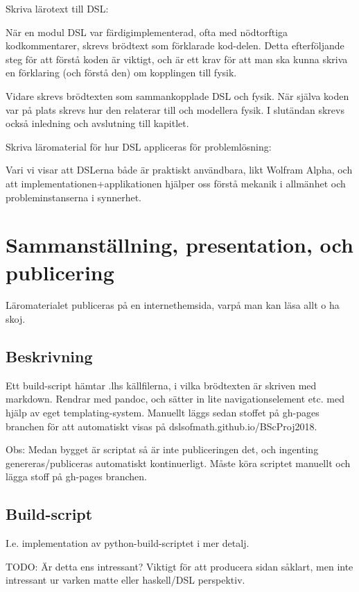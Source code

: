\begin{binge}
  Skriva lärotext till DSL:

  När en modul DSL var färdigimplementerad, ofta med nödtorftiga
  kodkommentarer, skrevs brödtext som förklarade kod-delen. Detta
  efterföljande steg för att förstå koden är viktigt, och är ett krav
  för att man ska kunna skriva en förklaring (och förstå den) om
  kopplingen till fysik.

  Vidare skrevs brödtexten som sammankopplade DSL och fysik. När
  själva koden var på plats skrevs hur den relaterar till och
  modellera fysik. I slutändan skrevs också inledning och avslutning
  till kapitlet.

  Skriva läromaterial för hur DSL appliceras för problemlösning:

  Vari vi visar att DSLerna både är praktiskt användbara, likt Wolfram
  Alpha, och att implementationen+applikationen hjälper oss förstå
  mekanik i allmänhet och probleminstanserna i synnerhet.



  \section{Sammanställning, presentation, och publicering}

  Läromaterialet publiceras på en internethemsida, varpå man kan läsa
  allt o ha skoj.

  \subsection{Beskrivning}

  Ett build-script hämtar .lhs källfilerna, i vilka brödtexten är
  skriven med markdown. Rendrar med pandoc, och sätter in lite
  navigationselement etc. med hjälp av eget templating-system. Manuellt
  läggs sedan stoffet på gh-pages branchen för att automatiskt visas på
  dslsofmath.github.io/BScProj2018.

  Obs: Medan bygget är scriptat så är inte publiceringen det, och
  ingenting genereras/publiceras automatiskt kontinuerligt. Måste köra
  scriptet manuellt och lägga stoff på gh-pages branchen.

  \subsection{Build-script}

  I.e. implementation av python-build-scriptet i mer detalj.

  TODO: Är detta ens intressant? Viktigt för att producera sidan såklart, men
  inte intressant ur varken matte eller haskell/DSL perspektiv.


\end{binge}
